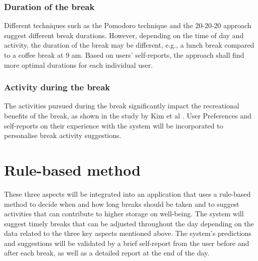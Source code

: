 \documentclass{hasel_thesis}
\begin{document}
\subsubsection{Duration of the break}
Different techniques such as the Pomodoro technique and the 20-20-20 approach suggest different break durations. However, depending on the time of day and activity, the duration of the break may be different, e.g., a lunch break compared to a coffee break at 9 am. Based on users’ self-reports, the approach shall find more optimal durations for each individual user.  

\subsubsection{Activity during the break}
The activities pursued during the break significantly impact the recreational benefits of the break, as shown in the study by Kim et al \cite{KimS.ParkY.&Niu.2017}. User Preferences and self-reports on their experience with the system will be incorporated to personalise break activity suggestions. 



\section{Rule-based method}
These three aspects will be integrated into an application that uses a rule-based method to decide when and how long breaks should be taken and to suggest activities that can contribute to higher storage on well-being. The system will suggest timely breaks that can be adjusted throughout the day depending on the data related to the three key aspects mentioned above. The system's predictions and suggestions will be validated by a brief self-report from the user before and after each break, as well as a detailed report at the end of the day.
\end{document}
